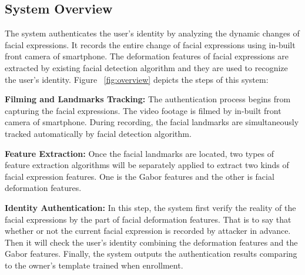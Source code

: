     \subsection{System Overview}
        The system authenticates the user's identity by analyzing the dynamic changes of facial expressions. It records the entire change of facial expressions using in-built front camera of smartphone. The deformation features of facial expressions are extracted by existing facial detection algorithm and they are used to recognize the user's identity.
        Figure ~\ref{fig:overview} depicts the steps of this system:
        
        \noindent {} \textbf{Filming and Landmarks Tracking:} The authentication process begins from capturing the facial expressions. The video footage is filmed by in-built front camera of smartphone. During recording, the facial landmarks are simultaneously tracked automatically by facial detection algorithm.
        
        \noindent {} \textbf{Feature Extraction:} Once the facial landmarks are located, two types of feature extraction algorithms will be separately applied to extract two kinds of facial expression features. One is the Gabor features and the other is facial deformation features.
        
        \noindent {} \textbf{Identity Authentication:} In this step, the system first verify the reality of the facial expressions by the part of facial deformation features.  That is to say that whether or not the current facial expression is recorded by attacker in advance. Then it will check the user's identity combining the deformation features and the Gabor features. Finally, the system outputs the authentication results comparing to the owner's template trained when enrollment.
         
